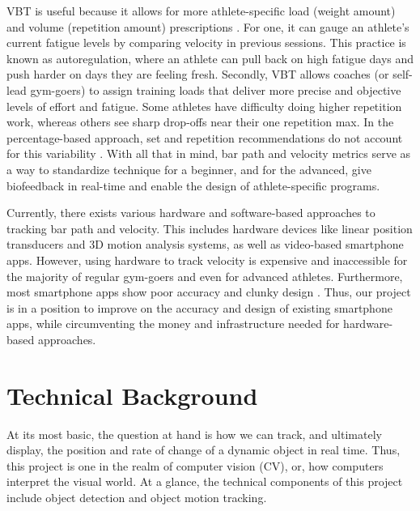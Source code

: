 \documentclass[10pt,twocolumn]{article}
\begin{document}
VBT is useful because it allows for more athlete-specific load (weight amount) and volume (repetition amount) prescriptions \cite{Weakley2021}.
For one, it can gauge an athlete's current fatigue levels by comparing velocity in previous sessions.
This practice is known as autoregulation, where an athlete can pull back on high fatigue days and push harder on days they are feeling fresh.
Secondly, VBT allows coaches (or self-lead gym-goers) to assign training loads that deliver more precise and objective levels of effort and fatigue.
Some athletes have difficulty doing higher repetition work, whereas others see sharp drop-offs near their one repetition max. 
In the percentage-based approach, set and repetition recommendations do not account for this variability \cite{Balsalobre-Fernández2021}.
With all that in mind, bar path and velocity metrics serve as a way to standardize technique for a beginner, and for the advanced, give biofeedback in real-time and enable the design of athlete-specific programs. \par

Currently, there exists various hardware and software-based approaches to tracking bar path and velocity.
This includes hardware devices like linear position transducers and 3D motion analysis systems, as well as video-based smartphone apps. 
However, using hardware to track velocity is expensive and inaccessible for the majority of regular gym-goers and even for advanced athletes. 
Furthermore, most smartphone apps show poor accuracy and clunky design \cite{Martinez-Cava2020, Kasovic2021}.
Thus, our project is in a position to improve on the accuracy and design of existing smartphone apps, while circumventing the money and infrastructure needed for hardware-based approaches. \par

\section{Technical Background}
At its most basic, the question at hand is how we can track, and ultimately display, the position and rate of change of a dynamic object in real time.
Thus, this project is one in the realm of computer vision (CV), or, how computers interpret the visual world. 
At a glance, the technical components of this project include object detection and object motion tracking.\par
\end{document}
